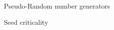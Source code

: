 \begin{section}{Pseudo-Random number generators}
\begin{subsection}{Seed criticality}
  \end{subsection}

\end{section}


